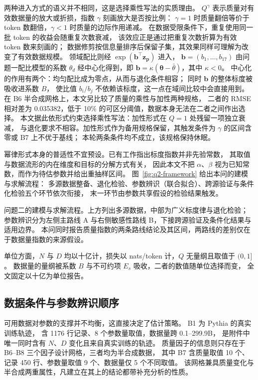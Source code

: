两种进入方式的语义并不相同，这是选择乘性写法的实质理由。
$Q^{\gamma}$ 表示质量对有效数据量的放大或折损，指数 $\gamma$ 刻画放大是否按比例：
$\gamma=1$ 时质量翻倍等价于 token 数翻倍，$\gamma<1$ 时质量的边际作用递减。
在数据受限条件下，重复使用同一批 token 的收益会随重复次数衰减，
该效应正是通过把重复次数折算为有效 token 数来刻画的\citep{muennighoff2023}；
数据修剪按信息量排序后保留子集，其效果同样可理解为改变了有效数据规模\citep{sorscher2022}。
领域配比则经 $\exp(\boldsymbol{b}^{\top}\boldsymbol{z}_{\boldsymbol{p}})$ 进入，
$\boldsymbol{b}=(b_1,\dots,b_{17})$ 由问题一配比模型的系数 $\theta_d$ 经中心化得到，即 $\boldsymbol{b}=\kappa(\boldsymbol{\theta}-\bar\theta)$，其中 $\kappa<0$。
中心化的作用有两个：均匀配比成为零点，从而与退化条件相容；
同时 $\boldsymbol{b}$ 的整体标度被吸收进系数 $B$，
使比值 $b_i/b_j$ 不依赖该标度，这一点在域间比较中会直接用到。
在 B6 半合成网格上，本文另比较了质量的乘性与加性两种规格，
二者的 RMSE 相对差为 0.035382，低于 10\% 的可区分阈值，数据本身无法在二者之间作出选择。
本文据此依形式约束选择乘性写法：加性形式在 $Q=1$ 处残留一项独立衰减，
与退化要求不相容。加性形式作为备用规格保留，其触发条件为 $\gamma$ 的区间含零或 B7 上不优于基线；
本轮两条条件均不成立，该规格保持休眠。

幂律形式本身的普适性不宜预设。已有工作指出标度指数并非先验常数，
其取值与数据流形的内在维度和目标的分解方式有关\citep{bahri2024}，
因此本文不把 $\alpha$、$\beta$ 视为已知常数，而作为待估参数并给出重抽样区间。
图~\ref{fig:q2-framework} 给出本问的建模与求解流程：
多源数据整备、退化检验、参数辨识（联合拟合）、跨源验证与条件化检验五个环节依次衔接，
末一环节由参数共享假设的检验结果触发。

问题二的建模与求解流程。上方列出多源数据，中部为广义标度律与退化检验；
  参数辨识分为左侧主路线 A 与右侧敏感性路线 B，下接跨源验证及条件化结果与适用边界。
  本问同时报告质量指数的两条路线结论及其区间，两路线的差别仅在于数据量指数的来源假设。



单位方面，$N$ 与 $D$ 均以十亿计，损失以 nats/token 计，$Q$ 无量纲且取值于 $(0,1]$。
数据量的量纲被系数 $B$ 与不可约项 $E_s$ 吸收，二者的数值随单位选择而变，
全文固定以十亿为单位报告。

\subsection{数据条件与参数辨识顺序}
\label{subsec:q2-identification}

可用数据对参数的支撑并不均衡，这直接决定了估计策略。
B1 为 Pythia 的真实训练轨迹\citep{biderman2023pythia}，
含 1176 行记录、8 个参数量取值，数据量跨 0.1--299.9B，
是附件中唯一同时含有 $N$、$D$ 变化且来自真实训练的轨迹。
质量因子的信息则只存在于 B6--B8 三个因子设计网格，三者均为半合成数据，
其中 B7 含质量取值 10 个、记录 450 行、参数量取值 9 个、数据量仅 5 个不同取值。
该网格兼具质量变化与半合成两重属性，凡建立在其上的结论都带补充分析的性质。

